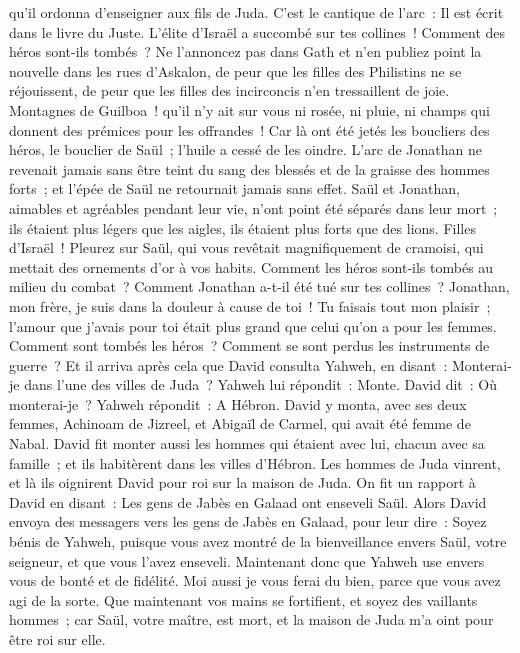 \begin{multicols}{2}
qu'il ordonna d'enseigner aux fils de Juda. C'est le cantique de l'arc~: Il est écrit dans le livre du Juste.
L'élite d'Israël a succombé sur tes collines~! Comment des héros sont-ils tombés~?
Ne l'annoncez pas dans Gath et n'en publiez point la nouvelle dans les rues d'Askalon, de peur que les filles des Philistins ne se réjouissent, de peur que les filles des incirconcis n'en tressaillent de joie.
Montagnes de Guilboa~! qu'il n'y ait sur vous ni rosée, ni pluie, ni champs qui donnent des prémices pour les offrandes~! Car là ont été jetés les boucliers des héros, le bouclier de Saül~; l'huile a cessé de les oindre.
L'arc de Jonathan ne revenait jamais sans être teint du sang des blessés et de la graisse des hommes forts~; et l'épée de Saül ne retournait jamais sans effet.
Saül et Jonathan, aimables et agréables pendant leur vie, n'ont point été séparés dans leur mort~; ils étaient plus légers que les aigles, ils étaient plus forts que des lions.
Filles d'Israël~! Pleurez sur Saül, qui vous revêtait magnifiquement de cramoisi, qui mettait des ornements d'or à vos habits.
Comment les héros sont-ils tombés au milieu du combat~? Comment Jonathan a-t-il été tué sur tes collines~?
Jonathan, mon frère, je suis dans la douleur à cause de toi~! Tu faisais tout mon plaisir~; l'amour que j'avais pour toi était plus grand que celui qu'on a pour les femmes.
Comment sont tombés les héros~? Comment se sont perdus les instruments de guerre~?
\VerseOne{}Et il arriva après cela que David consulta Yahweh, en disant~: Monterai-je dans l'une des villes de Juda~? Yahweh lui répondit~: Monte. David dit~: Où monterai-je~? Yahweh répondit~: A Hébron.
David y monta, avec ses deux femmes, Achinoam de Jizreel, et Abigaïl de Carmel, qui avait été femme de Nabal.
David fit monter aussi les hommes qui étaient avec lui, chacun avec sa famille~; et ils habitèrent dans les villes d'Hébron.
Les hommes de Juda vinrent, et là ils oignirent David pour roi sur la maison de Juda. On fit un rapport à David en disant~: Les gens de Jabès en Galaad ont enseveli Saül.
Alors David envoya des messagers vers les gens de Jabès en Galaad, pour leur dire~: Soyez bénis de Yahweh, puisque vous avez montré de la bienveillance envers Saül, votre seigneur, et que vous l'avez enseveli.
Maintenant donc que Yahweh use envers vous de bonté et de fidélité. Moi aussi je vous ferai du bien, parce que vous avez agi de la sorte.
Que maintenant vos mains se fortifient, et soyez des vaillants hommes~; car Saül, votre maître, est mort, et la maison de Juda m'a oint pour être roi sur elle.

\end{multicols}
